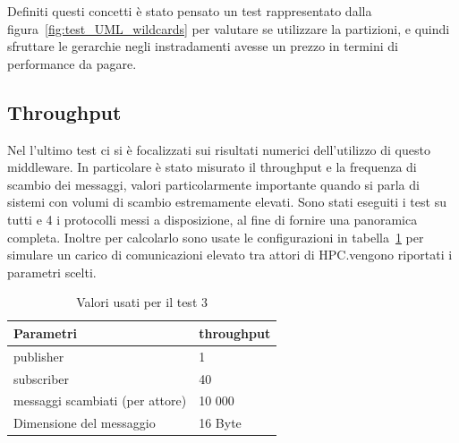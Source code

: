 Definiti questi concetti è stato pensato un test rappresentato dalla figura~\ref{fig:test_UML_wildcards} per valutare se utilizzare la partizioni, e quindi sfruttare le gerarchie negli instradamenti avesse un prezzo in termini di performance da pagare.  


\subsection{Throughput}
Nel l'ultimo test ci si è focalizzati sui risultati numerici dell'utilizzo di questo middleware. In particolare è stato misurato il throughput e la frequenza di scambio dei messaggi, valori particolarmente importante quando si parla di sistemi con volumi di scambio estremamente elevati. Sono stati eseguiti i test su tutti e 4 i protocolli messi a disposizione, al fine di fornire una panoramica completa. Inoltre per calcolarlo sono usate le configurazioni in tabella~\ref{table:test3} per simulare un carico di comunicazioni elevato tra attori di HPC.\@Nella vengono riportati i parametri scelti.

\begin{table}[H]
    \begin{center}%
    \begin{tabular}{l|l}
        \hline
        \textbf{Parametri} & \textbf{throughput} \\
        \hline
        [\#] publisher & 1  \\
        \hline
        [\#] subscriber & 40 \\
        \hline
        [\#] messaggi scambiati (per attore) & 10 000 \\
        \hline
        Dimensione del messaggio & 16 Byte \\
        \hline
    \end{tabular}
    \end{center}
    \caption{Valori usati per il test 3}\label{table:test3}
    \end{table}
    
